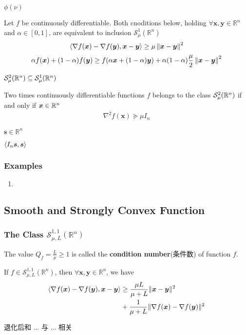 $\phi(\nu)$

\begin{theorem}
    Let $f$ be continuously differentiable. Both cnoditions below, holding $\forall \bm x,\bm y\in\mathbb{R}^n$ and $\alpha \in [0,1]$, are equivalent to inclusion $\mathcal{S}_\mu^1(\mathbb{R}^n)$
    \begin{equation}
        \braket{\nabla f(\bm{x})-\nabla f(\bm{y}),\bm{x}-\bm{y}}\ge\mu\left\lVert\bm{x}-\bm{y}\right\rVert^2
    \end{equation}
    \begin{equation}
        \alpha f(\bm{x})+(1-\alpha)f(\bm{y})\ge f(\alpha \bm{x}+(1-\alpha)\bm{y})
        +\alpha(1-\alpha)\frac{\mu}{2}\left\lVert\bm{x}-\bm{y}\right\rVert^2
    \end{equation}
\end{theorem}

$\mathcal{S}_\mu^2(\mathbb{R}^n)\subseteq \mathcal{S}_\mu^1(\mathbb{R}^n)$
\begin{theorem}
    Two times continuously differentiable functions $f$ belongs to the class $\mathcal{S}_\mu^2(\mathbb{R}^n)$ if and only if $\bm{x}\in\mathbb{R}^n$
    \begin{align*}
        \nabla^2 f(\bm x)\succeq \mu I_n
    \end{align*}
\end{theorem}
$\bm s\in \mathbb{R}^n$

$\braket{I_n \bm s, \bm s}$

\subsubsection{Examples}
\begin{enumerate}
    \item 
\end{enumerate}

\subsection{Smooth and Strongly Convex Function}
\subsubsection{The Class \texorpdfstring{$\mathcal{S}_{\mu,L}^{1,1}(\mathbb{R}^n)$}. }

The value $Q_f=\frac{L}{\mu}\ge 1$ is called the \textbf{condition number}(条件数) of function $f$. 


\begin{theorem}
    If $f\in \mathcal{S}_{\mu,L}^{1,1}(\mathbb{R}^n)$, then $\forall \bm x,\bm y\in \mathbb{R}^n$, we have
    \begin{align*}
        \braket{\nabla f(\bm x)-\nabla f(\bm y), \bm x-\bm y}&\ge \frac{\mu L}{\mu+L}\|\bm x-\bm y\|^2\\
        &+\frac{1}{\mu+L}\|\nabla f(\bm x)-\nabla f(\bm y)\|^2
    \end{align*}
\end{theorem}
退化后和 ... 与 ... 相关 %

